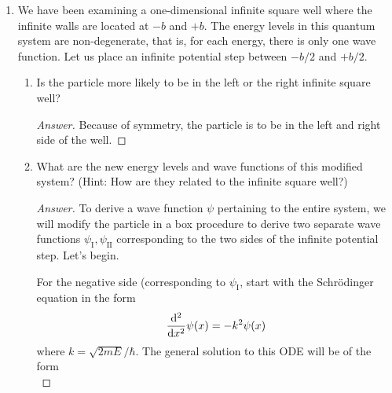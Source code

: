 \documentclass[../psets.tex]{subfiles}
\begin{document}
\begin{enumerate}
\begin{proof}[Answer]
\begin{align*}
        \end{align*}
        Thus, the time-dependent forms are
        \begin{align*}
            \psi_1(x,t) &= \frac{1}{\sqrt{b}}\cos\left( \frac{\pi x}{2b} \right)\cdot\e[-iE_1t/\hbar]&
                \psi_2(x,t) &= \frac{1}{\sqrt{b}}\sin\left( \frac{\pi x}{b} \right)\cdot\e[-iE_2t/\hbar]\\
            \Aboxed{\psi_1(x,t) &= \frac{1}{\sqrt{b}}\cos\left( \frac{\pi x}{2b} \right)\cdot\e[-i\hbar\pi^2t/8mb^2]}&
                \Aboxed{\psi_2(x,t) &= \frac{1}{\sqrt{b}}\sin\left( \frac{\pi x}{b} \right)\cdot\e[-i\hbar\pi^2t/2mb^2]}
        \end{align*}
    \end{proof}
    \item We have been examining a one-dimensional infinite square well where the infinite walls are located at $-b$ and $+b$. The energy levels in this quantum system are non-degenerate, that is, for each energy, there is only one wave function. Let us place an infinite potential step between $-b/2$ and $+b/2$.
    \begin{enumerate}
        \item Is the particle more likely to be in the left or the right infinite square well?
        \begin{proof}[Answer]
            Because of symmetry, the particle is  to be in the left and right side of the well.
        \end{proof}
        \item What are the new energy levels and wave functions of this modified system? (Hint: How are they related to the infinite square well?)
        \begin{proof}[Answer]
            To derive a wave function $\psi$ pertaining to the entire system, we will modify the particle in a box procedure to derive two separate wave functions $\psi_\text{I},\psi_\text{II}$ corresponding to the two sides of the infinite potential step. Let's begin.\par
            For the negative side (corresponding to $\psi_\text{I}$, start with the Schr\"{o}dinger equation in the form
            \begin{equation*}
                \dv[2]{x}\psi(x) = -k^2\psi(x)
            \end{equation*}
            where $k=\sqrt{2mE}/\hbar$. The general solution to this ODE will be of the form
            \begin{equation*}

\end{equation*}
\end{proof}
\end{enumerate}
\end{enumerate}
\end{document}
